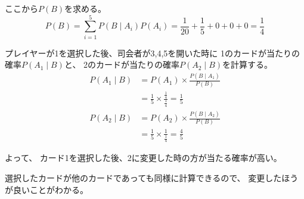 \documentclass[12pt,b5paper]{ltjsarticle}
\begin{document}
\begin{enumerate}
      ここから$P(B)$を求める。
      \begin{equation}
       P(B) = \sum_{i=1}^{5} P(B\mid A_{i}) P(A_{i})
        = \frac{1}{20} + \frac{1}{5} + 0 + 0 + 0 = \frac{1}{4}
      \end{equation}


      プレイヤーが1を選択した後、司会者が3,4,5を開いた時に
      1のカードが当たりの確率$P(A_{1} \mid B)$と、
      2のカードが当たりの確率$P(A_{2} \mid B)$を計算する。
      \begin{align}
       P(A_{1} \mid B)
       &= P(A_{1}) \times \frac{P(B\mid A_{1})}{P(B)}\\
       &= \frac{1}{5} \times \frac{\frac{1}{4}}{\frac{1}{4}}
       =\frac{1}{5}\\
       P(A_{2} \mid B)
       &= P(A_{2}) \times \frac{P(B\mid A_{2})}{P(B)}\\
       &= \frac{1}{5} \times \frac{1}{\frac{1}{4}}
       =\frac{4}{5}
      \end{align}

      よって、
      カード1を選択した後、2に変更した時の方が当たる確率が高い。

      選択したカードが他のカードであっても同様に計算できるので、
      変更したほうが良いことがわかる。



      \hrulefill
\end{enumerate}

\hrulefill
\end{document}
